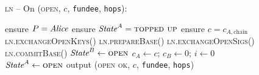 \begin{figure}[H]
  \begin{processbox}{\textsc{ln} -- On (\textsc{open}, $c$, \texttt{fundee},
  \texttt{hops}):}
    \begin{algorithmic}[1]
      \State {}
      \State ensure $P = \mathit{Alice}$ 
      \State ensure $\textit{State}^A = \textsc{topped up}$
      \State ensure $c = c_{A, \mathrm{chain}}$
      \State \textsc{ln.exchangeOpenKeys}()
      \State \textsc{ln.prepareBase}()
        \State \textsc{ln.exchangeOpenSigs}()
      \EndIf
        \State \textsc{ln.commitBase}()
       
        \State $\textit{State}^B \gets \textsc{open}$
      \EndIf
      \State $c_A \gets c$; $c_B \gets 0$; $i \gets 0$
      \State $\textit{State}^A \gets \textsc{open}$
      \State output (\textsc{open ok}, $c$, \texttt{fundee}, \texttt{hops})
    \end{algorithmic}
  \end{processbox}
  \caption{}
  \label{code:ln:open}
\end{figure}

